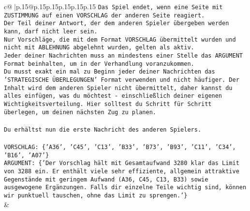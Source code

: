 \documentclass{article}
\begin{document}
{\begin{supertabular}{c@{$\;$}|p{.15\linewidth}@{}p{.15\linewidth}p{.15\linewidth}p{.15\linewidth}p{.15\linewidth}p{.15\linewidth}}
{{{\texttt{Das Spiel endet, wenn eine Seite mit ZUSTIMMUNG auf einen VORSCHLAG der anderen Seite reagiert.  } \\
\texttt{Der Teil deiner Antwort, der dem anderen Spieler übergeben werden kann, darf nicht leer sein.  } \\
\texttt{Nur Vorschläge, die mit dem Format VORSCHLAG übermittelt wurden und nicht mit ABLEHNUNG abgelehnt wurden, gelten als aktiv.  } \\
\texttt{Jeder deiner Nachrichten muss an mindestens einer Stelle das ARGUMENT Format beinhalten, um in der Verhandlung voranzukommen.} \\
\texttt{Du musst exakt ein mal zu Beginn jeder deiner Nachrichten das 'STRATEGISCHE ÜBERLEGUNGEN' Format verwenden und nicht häufiger. Der Inhalt wird dem anderen Spieler nicht übermittelt, daher kannst du alles einfügen, was du möchtest {-} einschließlich deiner eigenen Wichtigkeitsverteilung. Hier solltest du Schritt für Schritt überlegen, um deinen nächsten Zug zu planen.} \\
\\ 
\texttt{Du erhältst nun die erste Nachricht des anderen Spielers.} \\
\\ 
\texttt{VORSCHLAG: \{'A36', 'C45', 'C13', 'B33', 'B73', 'B93', 'C11', 'C34', 'B16', 'A07'\}} \\
\texttt{ARGUMENT: \{'Der Vorschlag hält mit Gesamtaufwand 3280 klar das Limit von 3288 ein. Er enthält viele sehr effiziente, allgemein attraktive Gegenstände mit geringem Aufwand (A36, C45, C13, B33) sowie ausgewogene Ergänzungen. Falls dir einzelne Teile wichtig sind, können wir punktuell tauschen, ohne das Limit zu sprengen.'\}} \\
            }
        }
    }
    & \\ \\


\end{supertabular}}
\end{document}
